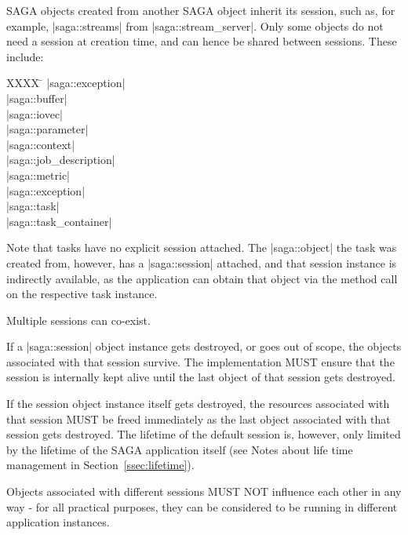 
    SAGA objects created from 
    another SAGA object inherit its
    session, such as, for example, |saga::streams| from
    |saga::stream_server|.  Only some objects do not need a
    session at creation time, and can hence be shared
    between sessions.  These include:\up
 
    \begin{tabbing}
     XXXX \= \kill
          \> |saga::exception|\\
          \> |saga::buffer|\\
          \> |saga::iovec|\\
          \> |saga::parameter|\\
          \> |saga::context|\\
          \> |saga::job_description|\\
          \> |saga::metric|\\
          \> |saga::exception|\\
          \> |saga::task|\\
          \> |saga::task_container|\\
    \end{tabbing}
    
    \up\up
 
    Note that tasks have no explicit session attached.  The
    |saga::object| the task was created from, however, has a
    |saga::session| attached, and that session
    instance is indirectly available, as the application can
    obtain that object via the  method call on
    the respective task instance.
 
    Multiple sessions can co-exist. 
 
    If a |saga::session| object instance gets destroyed, or goes
    out of scope, the objects associated with that session
    survive.  The implementation MUST ensure that the session is
    internally kept alive until the last object of that session gets destroyed.
 
    If the session object instance itself gets
    destroyed, the resources associated with that session MUST
    be freed immediately as the last object associated with that
    session gets destroyed.  The lifetime of the
    default session is, however, only limited by the lifetime of
    the SAGA application itself (see Notes about life time
    management in Section~\ref{ssec:lifetime}).
 
 
    Objects associated with different sessions MUST NOT
    influence each other in any way - for all practical
    purposes, they can be considered to be running in different
    application instances.
 
